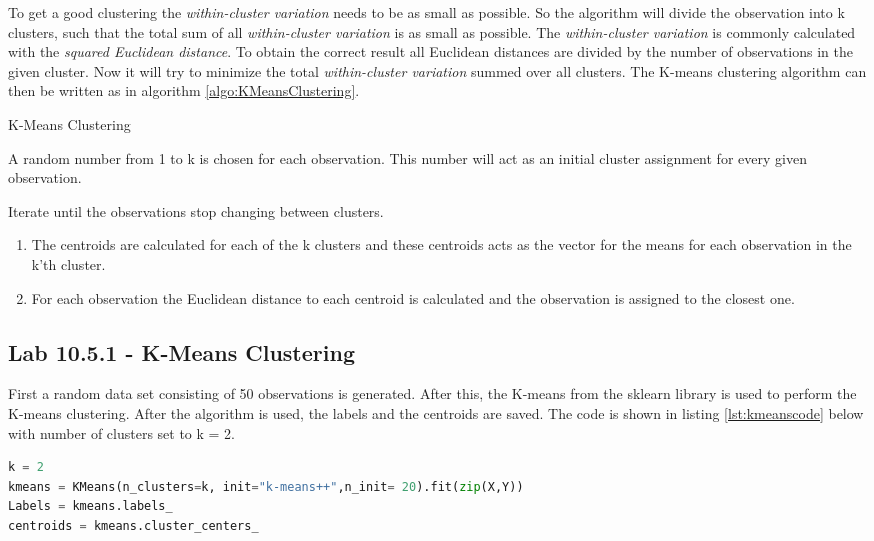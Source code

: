 To get a good clustering the \emph{within-cluster variation} needs to be as small as possible. So the algorithm will divide the observation into k clusters, such that the total sum of all \emph{within-cluster variation} is as small as possible. The \emph{within-cluster variation} is commonly calculated with the \emph{squared Euclidean distance}. To obtain the correct result all Euclidean distances are divided by the number of observations in the given cluster. Now it will try to minimize the total \emph{within-cluster variation} summed over all clusters.
The K-means clustering algorithm can then be written as in algorithm \ref{algo:KMeansClustering}.

\begin{algorithm}
	\caption{K-Means Clustering}
	\label{algo:KMeansClustering}
	\begin{algorithmic}[1]
		\State A random number from 1 to k is chosen for each observation. This number will act as an initial cluster assignment for every given observation.
		
		\State 
		Iterate until the observations stop changing between clusters.
		\begin{enumerate}[label=(\alph*)]
			\item The centroids are calculated for each of the k clusters and these centroids acts as the vector for the means for each observation in the k'th cluster.
			
			\item For each observation the Euclidean distance to each centroid is calculated and the observation is assigned to the closest one.
		\end{enumerate}
	\end{algorithmic}
\end{algorithm}

\subsection{Lab 10.5.1 - K-Means Clustering}
First a random data set consisting of 50 observations is generated. After this, the K-means from the sklearn library is used to perform the K-means clustering.
After the algorithm is used, the labels and the centroids are saved. The code is shown in listing \ref{lst:kmeanscode} below with number of clusters set to k = 2.
\begin{lstlisting}[language=Python, label=lst:kmeanscode, caption=The KMeans function]
k = 2
kmeans = KMeans(n_clusters=k, init="k-means++",n_init= 20).fit(zip(X,Y))
Labels = kmeans.labels_
centroids = kmeans.cluster_centers_
\end{lstlisting}

